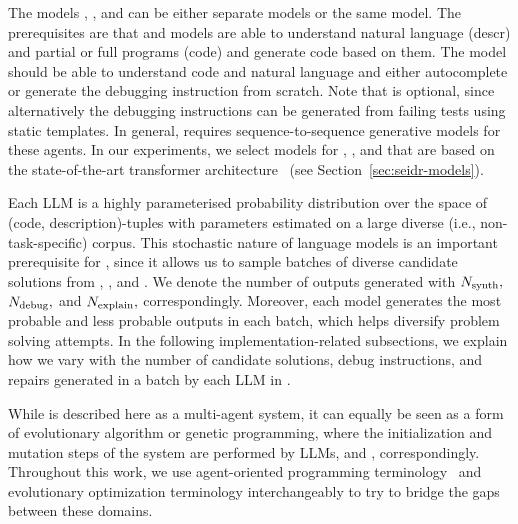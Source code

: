 The models \synthmodelnoargs{}, \debugmodelnoargs{}, and \textmodelnoargs{} can be either separate models or the same model.
The prerequisites are that \synthmodelnoargs{} and \debugmodelnoargs{} models are able to understand natural language (descr) and partial or full programs (code) and generate code based on them. 
The model \textmodelnoargs{}{} should be able to understand code and natural language and either autocomplete or generate the debugging instruction from scratch. 
Note that \textmodelnoargs{} is optional, since alternatively the debugging instructions can be generated from failing tests using static templates.
In general, \method{} requires sequence-to-sequence generative models for these agents. 
In our experiments, we select models for \synthmodelnoargs{}, \debugmodelnoargs{}, and \textmodelnoargs{} that are based on the state-of-the-art transformer architecture~\cite{vaswani2017:attention} 
(see Section~\ref{sec:seidr-models}). 

Each LLM is a highly parameterised probability distribution over the space of (code, description)-tuples with parameters estimated on a large diverse (i.e., non-task-specific) corpus.
This stochastic nature of language models is an important prerequisite for \method{}, since it allows us to sample batches of diverse candidate solutions from \synthmodelnoargs{}, \debugmodelnoargs{}, and \textmodelnoargs{}. 
We denote the number of outputs generated with $N_\text{synth}{},$ $N_\text{debug}{},$ and $N_\text{explain}{},$ correspondingly.
Moreover, each model generates the most probable and less probable outputs in each batch, which helps diversify problem solving attempts. 
In the following implementation-related subsections, we explain how we vary with the number of candidate solutions, debug instructions, and repairs generated in a batch by each LLM in \method{}.

While \method{} is described here as a multi-agent system, it can equally be seen as a form of evolutionary algorithm or genetic programming, where the initialization and mutation steps of the system are performed by LLMs, \synthmodelnoargs{} and \debugmodelnoargs{}, correspondingly.
Throughout this work, we use agent-oriented programming terminology~\cite{shoham1993:agentoriented} and evolutionary optimization terminology interchangeably to try to bridge the gaps between these domains.

